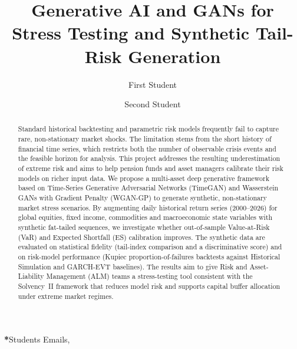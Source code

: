 \documentclass[12pt]{spieman}  %
\title{Generative AI and GANs for Stress Testing and Synthetic Tail-Risk Generation}
\author[a]{First Student}
\author[a]{Second Student}
\affil[a]{Norwegian University of Life Sciences, REALTEK, Industrial Economics (INDØK)}
\begin{document}
\maketitle

\begin{abstract}
Standard historical backtesting and parametric risk models frequently fail to capture rare, non-stationary market shocks. The limitation stems from the short history of financial time series, which restricts both the number of observable crisis events and the feasible horizon for analysis. This project addresses the resulting underestimation of extreme risk and aims to help pension funds and asset managers calibrate their risk models on richer input data. We propose a multi-asset deep generative framework based on Time-Series Generative Adversarial Networks (TimeGAN) and Wasserstein GANs with Gradient Penalty (WGAN-GP) to generate synthetic, non-stationary market stress scenarios. By augmenting daily historical return series (2000--2026) for global equities, fixed income, commodities and macroeconomic state variables with synthetic fat-tailed sequences, we investigate whether out-of-sample Value-at-Risk (VaR) and Expected Shortfall (ES) calibration improves. The synthetic data are evaluated on statistical fidelity (tail-index comparison and a discriminative score) and on risk-model performance (Kupiec proportion-of-failures backtests against Historical Simulation and GARCH-EVT baselines). The results aim to give Risk and Asset-Liability Management (ALM) teams a stress-testing tool consistent with the Solvency~II framework that reduces model risk and supports capital buffer allocation under extreme market regimes.
\end{abstract}


{\noindent \footnotesize\textbf{*}Students Emails,   }
\end{document}
